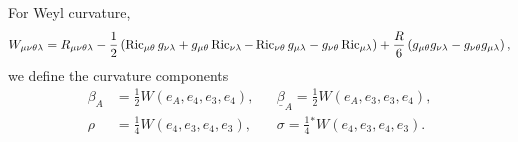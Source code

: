 For Weyl curvature,
\begin{equation*}
    W_{\mu\nu\theta\lambda}=R_{\mu\nu\theta\lambda}-\frac{1}{2}\left(\operatorname{Ric}_{\mu\theta}g_{\nu\lambda}+g_{\mu\theta}\operatorname{Ric}_{\nu\lambda}-\operatorname{Ric}_{\nu\theta}g_{\mu\lambda}-g_{\nu\theta}\operatorname{Ric}_{\mu\lambda}\right)+\frac{R}{6}\left(g_{\mu\theta}g_{\nu\lambda}-g_{\nu\theta}g_{\mu\lambda}\right),
\end{equation*}
we define the curvature components
\begin{equation}
\begin{aligned}
\beta_A & =\frac{1}{2} W\left(e_A, e_4, e_3, e_4\right), & & \underline{\beta}_A=\frac{1}{2} W\left(e_A, e_3, e_3, e_4\right), \\
\rho & =\frac{1}{4} W\left(e_4, e_3, e_4, e_3\right), & & \sigma=\frac{1}{4}{ }^* W\left(e_4, e_3, e_4, e_3\right).
\end{aligned}
\end{equation}
